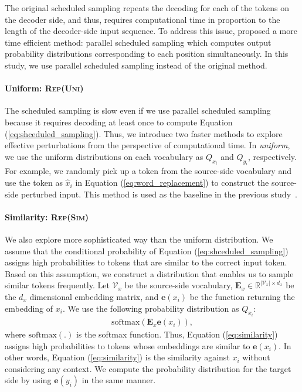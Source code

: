 \documentclass[11pt]{article}
\newcommand{\uniform}{\textsc{Rep(Uni)}}
\newcommand{\similarity}{\textsc{Rep(Sim)}}
\begin{document}
The original scheduled sampling repeats the decoding for each of the tokens on the decoder side, and thus, requires computational time in proportion to the length of the decoder-side input sequence.
To address this issue,  proposed a more time efficient method: parallel scheduled sampling which computes output probability distributions corresponding to each position simultaneously.
In this study, we use parallel scheduled sampling instead of the original method.

\paragraph{Uniform: \uniform{}}
The scheduled sampling is slow even if we use parallel scheduled sampling because it requires decoding at least once to compute Equation (\ref{eq:shceduled_sampling}).
Thus, we introduce two faster methods to explore effective perturbations from the perspective of computational time.
In \textit{uniform}, we use the uniform distributions on each vocabulary as $Q_{x_{i}}$ and $Q_{y_{i}}$, respectively.
For example, we randomly pick up a token from the source-side vocabulary and use the token as $\hat{x}_i$ in Equation (\ref{eq:word_replacement}) to construct the source-side perturbed input.
This method is used as the baseline in the previous study~\cite{NIPS2015_5956}.


\paragraph{Similarity: \similarity{}}
We also explore more sophisticated way than the uniform distribution.
We assume that the conditional probability of Equation (\ref{eq:shceduled_sampling}) assigns high probabilities to tokens that are similar to the correct input token.
Based on this assumption, we construct a distribution that enables us to sample similar tokens frequently.
Let $\mathcal{V}_x$ be the source-side vocabulary, $\bm{E}_x \in \mathbb{R}^{|\mathcal{V}_x | \times d_x}$ be the $d_x$ dimensional embedding matrix, and $\bm{e}(x_i)$ be the function returning the embedding of $x_i$.
We use the following probability distribution as $Q_{x_{i}}$:
\begin{align}
 \label{eq:similarity}
 \mathrm{softmax}(\bm{E}_x \bm{e}(x_i)),
\end{align}
where $\mathrm{softmax}(.)$ is the softmax function.
Thus, Equation (\ref{eq:similarity}) assigns high probabilities to tokens whose embeddings are similar to $\bm{e}(x_i)$.
In other words, Equation (\ref{eq:similarity}) is the similarity against $x_i$ without considering any context.
We compute the probability distribution for the target side by using $\bm{e}(y_i)$ in the same manner.
\end{document}
